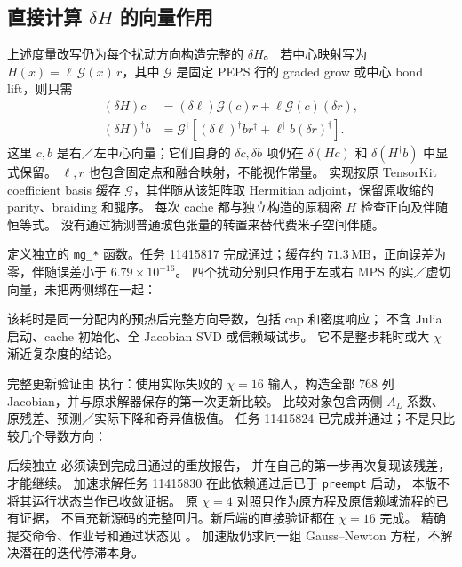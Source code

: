 \documentclass[11pt]{article}
\newcommand{\code}[1]{{\small\texttt{#1}}}
\begin{document}
\subsection{直接计算 $\delta H$ 的向量作用}
上述度量改写仍为每个扰动方向构造完整的 $\delta H$。
若中心映射写为 $H(x)=\ell\,\mathcal G(x)\,r$，其中
$\mathcal G$ 是固定 PEPS 行的 graded grow 或中心 bond lift，则只需
\begin{align}
 (\delta H)c&=(\delta\ell)\mathcal G(c)r+
                 \ell\mathcal G(c)(\delta r),\\
 (\delta H)^\dagger b&=\mathcal G^\dagger\left[
                 (\delta\ell)^\dagger b r^\dagger+
                 \ell^\dagger b(\delta r)^\dagger\right].
\end{align}
这里 $c,b$ 是右／左中心向量；它们自身的 $\delta c,\delta b$ 项仍在
$\delta(Hc)$ 和 $\delta(H^\dagger b)$ 中显式保留。
$\ell,r$ 也包含固定点和融合映射，不能视作常量。
实现按原 TensorKit coefficient basis 缓存 $\mathcal G$，其伴随从该矩阵取
Hermitian adjoint，保留原收缩的 parity、braiding 和腿序。
每次 cache 都与独立构造的原稠密 $H$ 检查正向及伴随恒等式。
没有通过猜测普通玻色张量的转置来替代费米子空间伴随。

定义独立的 \code{mg\_*} 函数。任务 11415817 完成通过；缓存约
$71.3\,\mathrm{MB}$，正向误差为零，伴随误差小于 $6.79\times10^{-16}$。
四个扰动分别只作用于左或右 MPS 的实／虚切向量，未把两侧绑在一起：
\begin{center}\small

\end{center}
该耗时是同一分配内的预热后完整方向导数，包括 cap 和密度响应；
不含 Julia 启动、cache 初始化、全 Jacobian SVD 或信赖域试步。
它不是整步耗时或大 $\chi$ 渐近复杂度的结论。

完整更新验证由  执行：使用实际失败的
$\chi=16$ 输入，构造全部 768 列 Jacobian，并与原求解器保存的第一次更新比较。
比较对象包含两侧 $A_L$ 系数、原残差、预测／实际下降和奇异值极值。
任务 11415824 已完成并通过；不是只比较几个导数方向：
\begin{center}\small

\end{center}
后续独立  必须读到完成且通过的重放报告，
并在自己的第一步再次复现该残差，才能继续。
加速求解任务 11415830 在此依赖通过后已于 \code{preempt} 启动，
本版不将其运行状态当作已收敛证据。
原 $\chi=4$ 对照只作为原方程及原信赖域流程的已有证据，
不冒充新源码的完整回归。新后端的直接验证都在 $\chi=16$ 完成。
精确提交命令、作业号和通过状态见
。
加速版仍求同一组 Gauss--Newton 方程，不解决潜在的迭代停滞本身。
\end{document}
